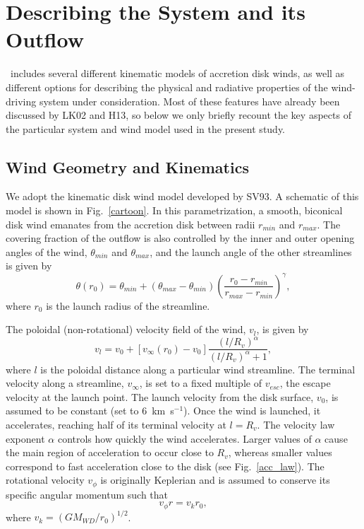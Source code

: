 \documentclass[preprint, a4paper, 11pt]{aastex}
\begin{document}
%
%

\section{Describing the System and its Outflow}

\py\ includes several different kinematic models of accretion disk
winds, as well as different options for describing the physical and
radiative properties of the wind-driving system under
consideration. Most of these features have already been discussed by
LK02 and H13, so below we only briefly recount the key aspects of the
particular system and wind model used in the present study.

\subsection{Wind Geometry and Kinematics}
\label{kinematics}

We adopt the kinematic disk wind model developed by SV93. 
A schematic of this model is shown in
Fig.~\ref{cartoon}. In this parametrization, a smooth, biconical
disk wind emanates from the accretion disk between radii $r_{min}$ and 
$r_{max}$. The covering fraction of the outflow is also controlled by the
inner and outer opening angles of the wind, $\theta_{min}$ and
$\theta_{max}$, and the launch angle of the other streamlines is given
by 
\begin{equation}
\theta(r_0) = \theta_{min} + (\theta_{max} - \theta_{min}) \left(\frac{r_0 - r_{min}}{r_{max} - r_{min}} \right)^{\gamma},
\label{theta}
\end{equation}
where $r_0$ is the launch radius of the streamline.

The poloidal (non-rotational) velocity field of the wind, $v_l$, is given by
\begin{equation}
v_l=v_0+\left[v_{\infty}(r_0)-v_0\right]\frac{\left(l/R_v\right)^{\alpha}}{\left(l/R_v\right)^{\alpha}+1},
\label{v_law}
\end{equation}
where $l$ is the poloidal distance along a particular wind
streamline. The terminal velocity along a streamline, $v_{\infty}$, is
set to a fixed multiple of $v_{esc}$, the escape velocity at the launch
point. The launch velocity from the disk surface, $v_0$, is assumed to
be constant (set to $6$~km~s$^{-1}$). Once the wind is launched, it
accelerates, reaching half of its terminal velocity at $l = R_v$. The
velocity law exponent $\alpha$ controls how quickly the wind
accelerates. Larger values of $\alpha$ cause the main region of 
acceleration to occur close to $R_v$, whereas smaller values
correspond to fast acceleration close to the disk (see
Fig.~\ref{acc_law}). The rotational velocity $v_\phi$ is originally 
Keplerian and is assumed to conserve its specific angular momentum
such that
\begin{equation}
v_\phi r = v_{k} r_0,
\label{v_law}
\end{equation}
where $v_{k}=(GM_{WD}/r_0)^{1/2}$.
\end{document}
